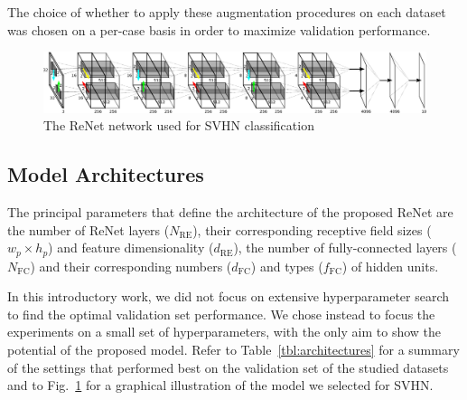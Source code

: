 The choice of whether to apply these augmentation procedures on each dataset was
chosen on a per-case basis in order to maximize validation performance.

\begin{figure}[t]
    \centering
    \includegraphics[height=.135\textheight,width=\columnwidth]{pdf/renet_svhn.pdf}
    \caption{The ReNet network used for SVHN classification}
    \label{fig:network}
\end{figure}

\subsection{Model Architectures}

The principal parameters that define the architecture of the proposed ReNet are
the number of ReNet layers ($N_{\text{RE}}$), their corresponding receptive field
sizes ($w_p \times h_p$) and feature dimensionality ($d_{\text{RE}}$),
the number of fully-connected layers ($N_{\text{FC}}$) and their corresponding
numbers ($d_{\text{FC}}$) and types ($f_{\text{FC}}$) of hidden units.

In this introductory work, we did not focus on extensive hyperparameter
search to find the optimal validation set
performance. We chose instead to focus the experiments on a small set of
hyperparameters, with the only aim to show the potential of the proposed model.
Refer to Table~\ref{tbl:architectures} for a summary of the settings that performed
best on the validation set of the studied datasets and to Fig.~\ref{fig:network}
for a graphical illustration of the model we selected for SVHN.

